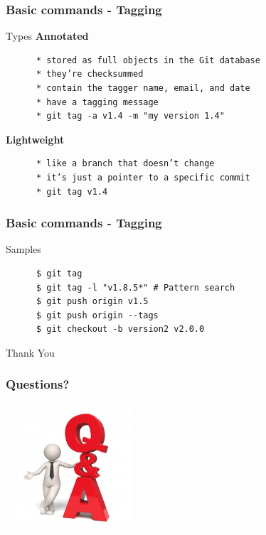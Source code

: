 \documentclass[10pt]{beamer}
\begin{document}
\begin{frame}[fragile]
  \frametitle{Basic commands - Tagging}
  \begin{block}{Types}
    \textbf{Annotated}
    \begin{verbatim}
      * stored as full objects in the Git database
      * they’re checksummed
      * contain the tagger name, email, and date
      * have a tagging message
      * git tag -a v1.4 -m "my version 1.4"
    \end{verbatim}
    \pause
    \textbf{Lightweight}
    \begin{verbatim}
      * like a branch that doesn’t change
      * it’s just a pointer to a specific commit
      * git tag v1.4
    \end{verbatim}
  \end{block}
\end{frame}

\begin{frame}[fragile]
  \frametitle{Basic commands - Tagging}
  \begin{block}{Samples}
    \begin{verbatim}
      $ git tag
      $ git tag -l "v1.8.5*" # Pattern search
      $ git push origin v1.5
      $ git push origin --tags
      $ git checkout -b version2 v2.0.0
    \end{verbatim}
  \end{block}
\end{frame}

\begin{frame}
  \begin{center}
    \Huge{Thank You}
  \end{center}
\end{frame}

\begin{frame}
	\frametitle{Questions?}
	\begin{center}
	\includegraphics[width=0.35\textwidth]{q2.jpg}
	\end{center}
\end{frame}

\end{document}
